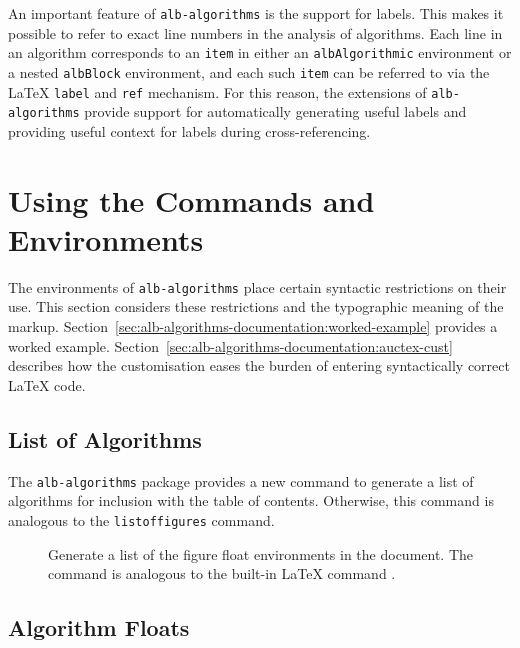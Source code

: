\documentclass[11pt,a4paper,oneside,titlepage]{alb-corp}
\begin{document}
An important feature of \texttt{alb-algorithms} is the support for
labels.  This makes it possible to refer to exact line numbers in the
analysis of algorithms.  Each line in an algorithm corresponds to an
\texttt{item} in either an \texttt{albAlgorithmic} environment or a
nested \texttt{albBlock} environment, and each such \texttt{item} can be
referred to via the \LaTeX{} \texttt{label} and \texttt{ref} mechanism.
For this reason, the \AUCTeX{} extensions of \texttt{alb-algorithms}
provide support for automatically generating useful labels and providing
useful context for labels during cross-referencing.




\section{Using the Commands and Environments}
\label{sec:alb-algorithms-documentation:using-comm-envir}

The environments of \texttt{alb-algorithms} place certain syntactic
restrictions on their use.  This section considers these restrictions
and the typographic meaning of the markup.
Section~\ref{sec:alb-algorithms-documentation:worked-example} provides a
worked example.
Section~\ref{sec:alb-algorithms-documentation:auctex-cust} describes how
the \AUCTeX{} customisation eases the burden of entering syntactically
correct \LaTeX{} code.



\subsection{List of Algorithms}
\label{sec:alb-algorithms-documentation:list-algor}

The \texttt{alb-algorithms} package provides a new command to generate a
list of algorithms for inclusion with the table of contents.  Otherwise,
this command is analogous to the \texttt{listoffigures} command.

\begin{description}
\item[] Generate a list of the figure float
  environments in the document.  The command is analogous to the
  built-in LaTeX command .
\end{description}



\subsection{Algorithm Floats}
\label{sec:alb-algorithms-documentation:algor-floats}
\end{document}
